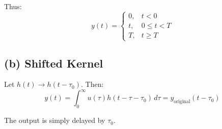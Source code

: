 Thus:
\[
y(t) =
\begin{cases}
0, & t < 0 \\
t, & 0 \le t < T \\
T, & t \ge T
\end{cases}
\]

\subsection*{(b) Shifted Kernel}
Let \( h(t) \rightarrow h(t - \tau_0) \). Then:
\[
y(t) = \int_0^\infty u(\tau) h(t - \tau - \tau_0) \, d\tau = y_{\text{original}}(t - \tau_0)
\]

The output is simply delayed by \( \tau_0 \).

